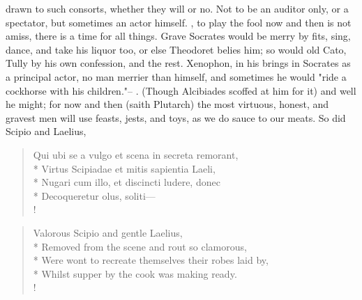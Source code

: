{drawn to such consorts, whether they will or no. Not to be an auditor only, or a spectator, but sometimes an actor himself. , to play the fool now and then is not amiss, there is a time for all things. Grave Socrates would be merry by fits, sing, dance, and take his liquor too, or else Theodoret belies him; so would old Cato, Tully by his own confession, and the rest. Xenophon, in his  brings in Socrates as a principal actor, no man merrier than himself, and sometimes he would "ride a cockhorse with his children."-- . (Though Alcibiades scoffed at him for it) and well he might; for now and then (saith Plutarch) the most virtuous, honest, and gravest men will use feasts, jests, and toys, as we do sauce to our meats. So did Scipio and Laelius,
%
\begin{latin}
\begin{verse}%
Qui ubi se a vulgo et scena in secreta remorant,\\*
Virtus Scipiadae et mitis sapientia Laeli,\\*
Nugari cum illo, et discincti ludere, donec\\*
Decoqueretur olus, soliti---\\!
\end{verse}%
\end{latin}
\translationrule%
\begin{verse}%
Valorous Scipio and gentle Laelius,\\*
Removed from the scene and rout so clamorous,\\*
Were wont to recreate themselves their robes laid by,\\*
Whilst supper by the cook was making ready.\\!
\end{verse}%

}
